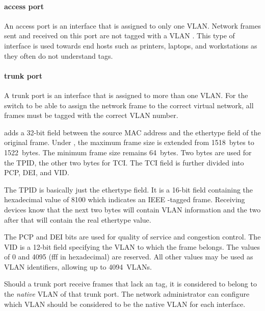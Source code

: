 \paragraph{access port}
An access port is an interface that is assigned to only one \acs{VLAN}.
Network frames sent and received on this port are not tagged with a \acs{VLAN} .
This type of interface is used towards end hosts such as printers, laptops, and workstations as they often do not understand  tags.


\paragraph{trunk port}
A trunk port is an interface that is assigned to more than one \acs{VLAN}.
For the switch to be able to assign the network frame to the correct virtual network, all frames must be tagged with the correct \acs{VLAN} number.

 adds a 32-bit field between the source \acs{MAC} address and the ethertype field of the original frame.
Under , the maximum frame size is extended from 1518~bytes to 1522~bytes.
The minimum frame size remains 64~bytes.
Two bytes are used for the \acf{TPID}, the other two bytes for \acf{TCI}.
The \acs{TCI} field is further divided into \acs{PCP}, \acs{DEI}, and \acs{VID}.


The \acl{TPID} is basically just the ethertype field.
It is a 16-bit field containing the hexadecimal value of 8100 which indicates an \acs{IEEE} -tagged frame.
Receiving devices know that the next two bytes will contain \acs{VLAN} information and the two after that will contain the real ethertype value.

The \acs{PCP} and \acs{DEI} bits are used for quality of service and congestion control.
The \acl{VID} is a 12-bit field specifying the \acs{VLAN} to which the frame belongs.
The values of 0 and 4095 (f{}f{}f in hexadecimal) are reserved.
All other values may be used as \acs{VLAN} identifiers, allowing up to 4094~\acp{VLAN}.

Should a trunk port receive frames that lack an  tag, it is considered to belong to the \emph{native} \acs{VLAN} of that trunk port.
The network administrator can configure which \acs{VLAN} should be considered to be the native \acs{VLAN} for each interface.


